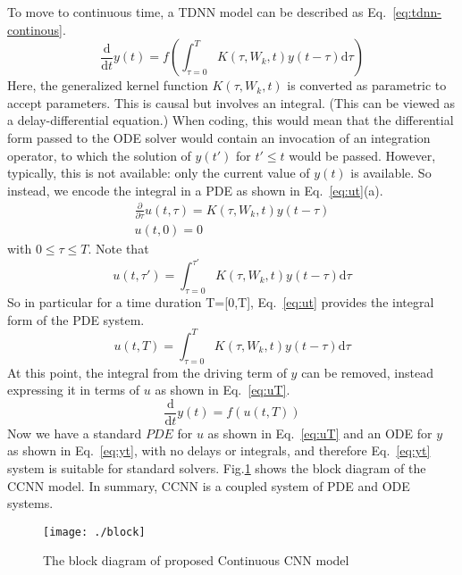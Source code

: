 \documentclass{article}
\newcommand{\ddx}[1]{\frac{\textrm{d}}{\textrm{d}#1}}
\newcommand{\ddt}{\ddx{t}}
\newcommand{\ppx}[1]{\frac{\partial}{\partial#1}}
\begin{document}
To move to continuous time, a TDNN model can be described as Eq.~\eqref{eq:tdnn-continous}.
\begin{equation}
  \ddt y(t) = f( \int_{\tau=0}^T K(\tau, W_k, t) y(t-\tau) \textrm{d}\tau )
  \label{eq:tdnn-continous}
\end{equation}
Here, the generalized kernel function $K(\tau, W_k, t)$ is converted as parametric to accept parameters. This is causal but involves an integral. (This can be viewed as a delay-differential equation.) When coding, this would mean that the differential form passed to the ODE solver would contain an invocation of an integration operator, to which the solution of $y(t')$ for $t'\leq t$ would be passed. However, typically, this is not available: only the current value of $y(t)$ is available. So instead, we encode the integral in a PDE as shown in Eq.~\eqref{eq:ut}(a).
\begin{subequations}
  \begin{gather}
    \ppx{\tau} u(t,\tau) = K(\tau, W_k, t) y(t-\tau) \\
    u(t,0) = 0
  \end{gather}
  \label{eq:ut}
\end{subequations}
with $0 \leq \tau \leq T$. Note that
\begin{equation}
  u(t,\tau') = \int_{\tau=0}^{\tau'} K(\tau, W_k, t) y(t-\tau) \textrm{d}\tau
  \label{eq:utau}
\end{equation}
So in particular for a time duration T=[0,T], Eq.~\eqref{eq:ut} provides the integral form of the PDE system.
\begin{equation}
  u(t,T) = \int_{\tau=0}^T K(\tau, W_k, t) y(t-\tau) \textrm{d}\tau
  \label{eq:uT}
\end{equation}
At this point, the integral from the driving term of $y$ can be removed, instead expressing it in terms of $u$ as shown in Eq.~\eqref{eq:uT}.
\begin{equation}
  \ddt y(t) = f(u(t,T))
  \label{eq:yt}
\end{equation}
Now we have a standard $PDE$ for $u$ as shown in Eq.~\eqref{eq:uT} and an ODE for $y$ as shown in Eq.~\eqref{eq:yt}, with no delays or integrals, and therefore Eq.~\eqref{eq:yt} system is suitable for standard solvers. Fig.\ref{fig:block} shows the block diagram of the CCNN model. In summary, CCNN is a coupled system of PDE and ODE systems.


\begin{figure}
    \centering
    \texttt{[image: ./block]}
    \caption{The block diagram of proposed Continuous CNN model}
    \label{fig:block}
\end{figure}
\end{document}
